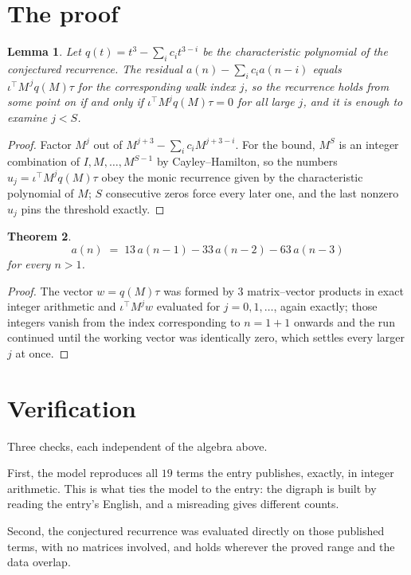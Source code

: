 \documentclass[11pt,a4paper]{article}
\theoremstyle{plain}
\newtheorem{theorem}{Theorem}
\newtheorem{lemma}[theorem]{Lemma}
\theoremstyle{definition}
\begin{document}
\section{The proof}

\begin{lemma}\label{lem:crit}
Let $q(t)=t^{3}-\sum_i c_it^{3-i}$ be the characteristic polynomial of the
conjectured recurrence. The residual $a(n)-\sum_ic_ia(n-i)$ equals
$\iota^{\!\top}M^{\,j}q(M)\tau$ for the corresponding walk index $j$, so the recurrence
holds from some point on if and only if $\iota^{\!\top}M^{j}q(M)\tau=0$ for all large $j$,
and it is enough to examine $j<S$.
\end{lemma}

\begin{proof}
Factor $M^{j}$ out of $M^{j+3}-\sum_ic_iM^{j+3-i}$. For the bound, $M^{S}$
is an integer combination of $I,M,\dots,M^{S-1}$ by Cayley--Hamilton, so the numbers
$u_j=\iota^{\!\top}M^{j}q(M)\tau$ obey the monic recurrence given by the characteristic
polynomial of $M$; $S$ consecutive zeros force every later one, and the last nonzero $u_j$
pins the threshold exactly.
\end{proof}

\begin{theorem}
\[
a(n)\;=\;13\,a(n-1) - 33\,a(n-2) - 63\,a(n-3)
\]
for every $n>1$.
\end{theorem}

\begin{proof}
The vector $w=q(M)\tau$ was formed by $3$ matrix--vector products in exact integer
arithmetic and $\iota^{\!\top}M^{j}w$ evaluated for $j=0,1,\dots$, again exactly; those
integers vanish from the index corresponding to $n=1+1$ onwards and the run continued
until the working vector was identically zero, which settles every larger $j$ at once.
\end{proof}

\section{Verification}

Three checks, each independent of the algebra above.

First, the model reproduces all $19$ terms the entry publishes, exactly, in integer
arithmetic. This is what ties the model to the entry: the digraph is built by reading the
entry's English, and a misreading gives different counts.

Second, the conjectured recurrence was evaluated directly on those published terms, with no
matrices involved, and holds wherever the proved range and the data overlap.
\end{document}
